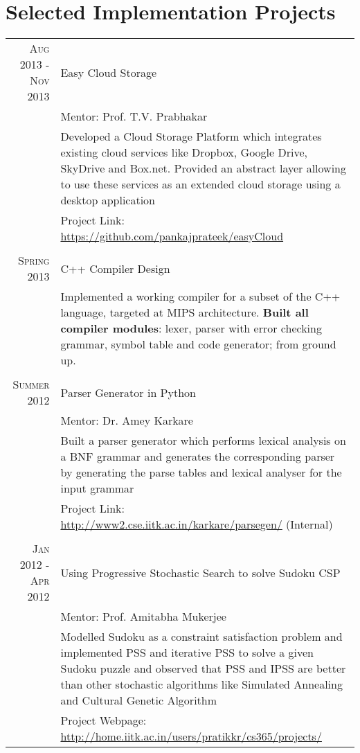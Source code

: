 \documentclass[a4paper,10pt]{article}
\begin{document}
\section{Selected Implementation Projects}
\begin{tabular}{r|p{12cm}}
 \textsc{Aug 2013 - Nov 2013} & Easy Cloud Storage \\
 &\small{Mentor: Prof. T.V. Prabhakar}\\
&\small{Developed a Cloud Storage Platform which integrates existing cloud services like Dropbox, Google Drive, SkyDrive and Box.net. Provided an abstract layer allowing to use these services as an extended cloud storage using a desktop application}\\
& \small{Project Link: \href{https://github.com/pankajprateek/easyCloud}{https://github.com/pankajprateek/easyCloud}}\\

 \multicolumn{2}{c}{} \\
\textsc{Spring 2013} & C++ Compiler Design\\
&\small{Implemented a working compiler for a subset of the C++ language, targeted at MIPS architecture. \textbf{Built all compiler modules}: lexer, parser with error checking grammar, symbol table and code generator; from ground up.}\\

\multicolumn{2}{c}{} \\
\textsc{Summer 2012} & Parser Generator in Python\\
&\small{Mentor: Dr. Amey Karkare}\\
& \small{Built a parser generator which performs lexical analysis on a BNF grammar and generates the corresponding parser by generating the parse tables and lexical analyser for the input grammar}\\
& \small{Project Link: \href{http://www2.cse.iitk.ac.in/karkare/parsegen/}{http://www2.cse.iitk.ac.in/karkare/parsegen/} (Internal)}\\

 \multicolumn{2}{c}{} \\
 \textsc{Jan 2012 - Apr 2012} & Using Progressive Stochastic Search to solve Sudoku CSP \\
&\small{Mentor: Prof. Amitabha Mukerjee}\\
& \small{Modelled Sudoku as a constraint satisfaction problem and implemented PSS and iterative PSS to solve a given Sudoku puzzle and observed that PSS and IPSS are better than other stochastic algorithms like Simulated Annealing and Cultural Genetic Algorithm}\\
&\small{Project Webpage: \href{http://home.iitk.ac.in/users/pratikkr/cs365/projects/}{http://home.iitk.ac.in/users/pratikkr/cs365/projects/}}\\

\end{tabular}
\end{document}
